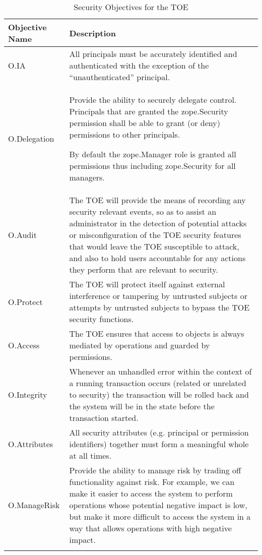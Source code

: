 \documentclass[12pt,english]{scrbook}
\begin{document}
\begin{longtable}[c]{lp{10cm}}
  \toprule
  Objective Name & Description \\
  \midrule\endhead
  
  O.IA
   & 
  All principals must be accurately identified and
  authenticated with the exception of the ``unauthenticated''
  principal.
   \\

  O.Delegation
   & 

  Provide the ability to securely delegate control. Principals that are granted
  the zope.Security permission shall be able to grant (or deny) permissions to
  other principals.
  
  By default the zope.Manager role is granted all permissions thus including
  zope.Security for all managers.

  \\

  O.Audit
   & 
  The TOE will provide the means of recording any
  security relevant events, so as to assist an
  administrator in the detection of potential attacks
  or misconfiguration of the TOE security features
  that would leave the TOE susceptible to attack, and
  also to hold users accountable for any actions
  they perform that are relevant to security.
   \\

  O.Protect
   & 
  The TOE will protect itself against external
  interference or tampering by untrusted subjects or
  attempts by untrusted subjects to bypass the TOE
  security functions.
   \\

  O.Access
   & 
  The TOE ensures that access to objects is always
  mediated by operations and guarded by permissions.
   \\

  O.Integrity
   & 
  Whenever an unhandled error within the context of a
  running transaction occurs (related or unrelated
  to security) the transaction will be rolled back
  and the system will be in the state before the
  transaction started.
   \\

  O.Attributes &  All security attributes (e.g. principal or permission
    identifiers) together must form a meaningful whole at all times. \\

  O.ManageRisk
   & 
  Provide the ability to manage risk by trading off
  functionality against risk. For example, we can
  make it easier to access the system to perform
  operations whose potential negative impact is
  low, but make it more difficult to access the
  system in a way that allows operations with high
  negative impact.
  \\
  \bottomrule
  \caption{Security Objectives for the TOE}
\end{longtable}
\end{document}
